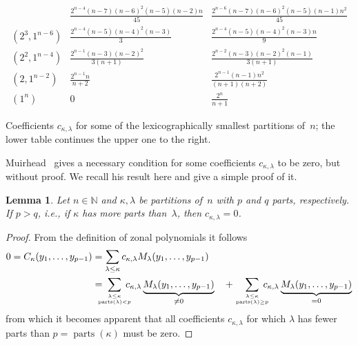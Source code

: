 \documentclass[10pt,oneside,american]{amsart}
\numberwithin{equation}{section}
\numberwithin{figure}{section}
\theoremstyle{definition}
\theoremstyle{remark}
\theoremstyle{plain}
\theoremstyle{definition}
\theoremstyle{plain}
\theoremstyle{plain}
\newtheorem{lemma}{Lemma}[section]
\theoremstyle{plain}
\begin{document}
\begin{table}
\[\begin{array}{c|cc}
    & \frac{2^{n-4} (n-7) (n-6)^2 (n-5) (n-2) n}{45}
    & \frac{2^{n-6} (n-7) (n-6)^2 (n-5) (n-1) n^2}{45}
    \\[1ex]
    (2^3,1^{n-6})
    & \frac{2^{n-4} (n-5) (n-4)^2 (n-3)}{3}
    & \frac{2^{n-4} (n-5) (n-4)^2 (n-3) n}{9}
    \\[1ex]
    (2^2,1^{n-4})
    & \frac{2^{n-1} (n-3) (n-2)^2}{3 (n+1)}
    & \frac{2^{n-2} (n-3) (n-2)^2 (n-1)}{3 (n+1)}
    \\[1ex]
    (2,1^{n-2})
    & \frac{2^{n-1} n}{n+2}
    & \frac{2^{n-1} (n-1) n^2}{(n+1) (n+2)}
    \\[1ex]
    (1^n)
    & 0 & \frac{2^n}{n+1}
\end{array}
\]
\caption{Coefficients $c_{\kappa,\lambda}$ for some of the lexicographically
  smallest partitions of~$n$; the lower table continues the upper one to the
  right.}
\label{tab:cn2}
\end{table}

Muirhead~\cite[Lemma~7.2.3]{Muirhead} gives a necessary condition for some
coefficients $c_{\kappa,\lambda}$ to be zero, but without proof. We recall his
result here and give a simple proof of it.
\begin{lemma}\label{lem:zero1}
  Let $n\in\mathbb{N}$ and $\kappa,\lambda$ be partitions of~$n$ with $p$ and
  $q$ parts, respectively. If $p>q$, i.e., if $\kappa$ has more parts
  than~$\lambda$, then $c_{\kappa,\lambda}=0$.
\end{lemma}
\begin{proof}
  From the definition of zonal polynomials it follows
  \begin{align*}
    0 = C_{\kappa}(y_1,\dots,y_{p-1}) &=
    \sum_{\lambda\leq\kappa} c_{\kappa,\lambda} M_{\lambda}(y_1,\dots,y_{p-1}) \\
    &= \!\!\!\!\!\sum_{\genfrac{}{}{0pt}{}{\lambda\leq\kappa}{\operatorname{parts}(\lambda)<p}}\!\!\!\!\!
      c_{\kappa,\lambda} \underbrace{M_{\lambda}(y_1,\dots,y_{p-1})}_{\neq0} \quad +
    \sum_{\genfrac{}{}{0pt}{}{\lambda\leq\kappa}{\operatorname{parts}(\lambda)\geq p}}\!\!\!\!\!
      c_{\kappa,\lambda} \underbrace{M_{\lambda}(y_1,\dots,y_{p-1})}_{=0}
  \end{align*}
  from which it becomes apparent that all coefficients $c_{\kappa,\lambda}$
  for which $\lambda$ has fewer parts than $p=\operatorname{parts}(\kappa)$
  must be zero.
\end{proof}
\end{document}
